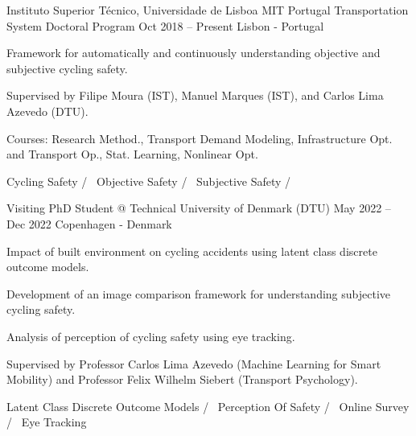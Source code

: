 

\begin{cventries}





  \cventry
    {Instituto Superior Técnico, Universidade de Lisboa} %
    {MIT Portugal Transportation System Doctoral Program} %
    {Oct 2018 – Present} %
    {Lisbon - Portugal} %
    {
      \begin{cvitems} %
        \item {Framework for automatically and continuously understanding objective and subjective cycling safety.}
        \item {Supervised by Filipe Moura (IST), Manuel Marques (IST), and Carlos Lima Azevedo (DTU).}
        \item {Courses: Research Method., Transport Demand Modeling, Infrastructure Opt. and Transport Op., Stat. Learning, Nonlinear Opt.}
      \end{cvitems}
    }
    {
      Cycling Safety /~
      Objective Safety /~
      Subjective Safety /~
    }

  \cventryinner
    {Visiting PhD Student @ Technical University of Denmark (DTU)} %
    {May 2022 – Dec 2022} %
    {Copenhagen - Denmark} %
    {
      \begin{cvitems} %
        \item {Impact of built environment on cycling accidents using latent class discrete outcome models.}
        \item {Development of an image comparison framework for understanding subjective cycling safety.}
        \item {Analysis of perception of cycling safety using eye tracking.}
        \item {Supervised by Professor Carlos Lima Azevedo (Machine Learning for Smart Mobility) and Professor Felix Wilhelm Siebert (Transport Psychology).}
      \end{cvitems}
    }
    {
      Latent Class Discrete Outcome Models /~
      Perception Of Safety /~
      Online Survey /~
      Eye Tracking
    }


\end{cventries}
